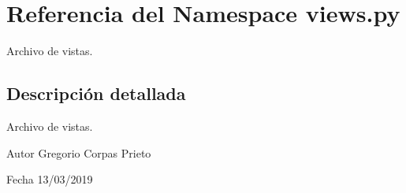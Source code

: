 \hypertarget{namespaceviews_1_1py}{}\section{Referencia del Namespace views.\+py}
\label{namespaceviews_1_1py}


Archivo de vistas.  




\subsection{Descripción detallada}
Archivo de vistas. 

\begin{DoxyAuthor}{Autor}
Gregorio Corpas Prieto 
\end{DoxyAuthor}
\begin{DoxyDate}{Fecha}
13/03/2019 
\end{DoxyDate}
